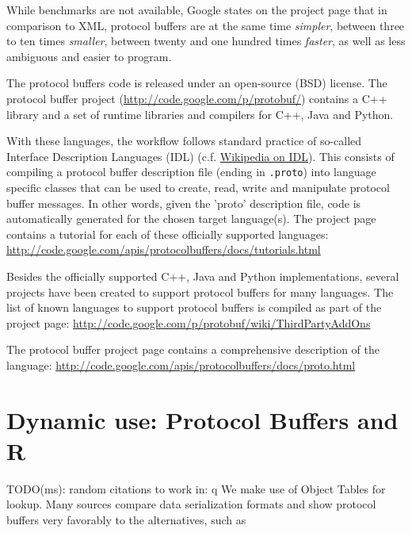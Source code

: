 While benchmarks are not available, Google states on the project page that in
comparison to XML, protocol buffers are at the same time \textsl{simpler},
between three to ten times \textsl{smaller}, between twenty and one hundred
times \textsl{faster}, as well as less ambiguous and easier to program.

The protocol buffers code is released under an open-source (BSD) license. The
protocol buffer project (\url{http://code.google.com/p/protobuf/})
contains a C++ library and a set of runtime libraries and compilers for
C++, Java and Python.

With these languages, the workflow follows standard practice of so-called
Interface Description Languages (IDL)
(c.f. \href{http://en.wikipedia.org/wiki/Interface_description_language}{Wikipedia
  on IDL}).  This consists of compiling a protocol buffer description file
(ending in \texttt{.proto}) into language specific classes that can be used
to create, read, write and manipulate protocol buffer messages. In other
words, given the 'proto' description file, code is automatically generated
for the chosen target language(s). The project page contains a tutorial for
each of these officially supported languages:
\url{http://code.google.com/apis/protocolbuffers/docs/tutorials.html}

Besides the officially supported C++, Java and Python implementations, several projects have been
created to support protocol buffers for many languages. The list of known
languages to support protocol buffers is compiled as part of the
project page: \url{http://code.google.com/p/protobuf/wiki/ThirdPartyAddOns}

The protocol buffer project page contains a comprehensive
description of the language: \url{http://code.google.com/apis/protocolbuffers/docs/proto.html}

%

\section{Dynamic use: Protocol Buffers and R}

TODO(ms): random citations to work in:
q
We make use of Object Tables \citep{RObjectTables} for lookup.
Many sources compare data serialization formats and show protocol
buffers very favorably to the alternatives, such
as \citep{Sumaray:2012:CDS:2184751.2184810}

